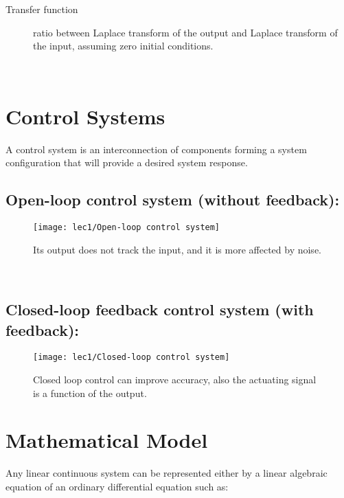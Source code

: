 \begin{description}
	\item[Transfer function] ratio between Laplace transform of the output and Laplace transform of the input, assuming zero initial conditions.
\end{description}
 \leavevmode\\[-5em]

\section{Control Systems}
A control system is an interconnection of components forming a system configuration that will provide a desired system response.
\\[-2em]

\subsection[Open-loop control system]{Open-loop control system (without feedback):}
\begin{figure}[hb]
		\raggedleft
		\texttt{[image: lec1/Open-loop control system]}
		\caption[Open-loop: block diagram]{Its output does not track the input, and it is more affected by noise.}
\end{figure}
 \leavevmode\\[-4em]

\subsection[Closed-loop control system]{Closed-loop feedback control system (with feedback):}

\begin{figure}[hb]
		\raggedleft
		\texttt{[image: lec1/Closed-loop control system]}
		\caption[Closed-loop: block diagram]{Closed loop control can improve accuracy, also the actuating signal is a function of the output.}
\end{figure}

\section{Mathematical Model}
Any linear continuous system can be represented either by a linear algebraic equation of an ordinary differential equation such as:\\[-4mm]

